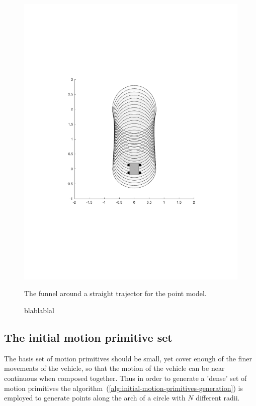 \begin{figure}
\begin{minipage}{0.4\textwidth}
    \includegraphics[scale=.3]{figures/method/expanded-funnel-with-car}
    \caption{The funnel around a straight trajector for the point model.}
  \end{minipage}
  \caption{blablablal}
  \label{fig:expanded-and-unexpanded}
\end{figure}


\subsection{The initial motion primitive set}

The basis set of motion primitives should be small, yet cover enough of the
finer movements of the vehicle, so that the motion of the vehicle can be near
continuous when composed together. Thus in order to generate a 'dense' set of
motion primitives the algorithm~(\ref{alg:initial-motion-primitives-generation})
is employed to generate points along the arch of a circle with \(N\) different
radii.


